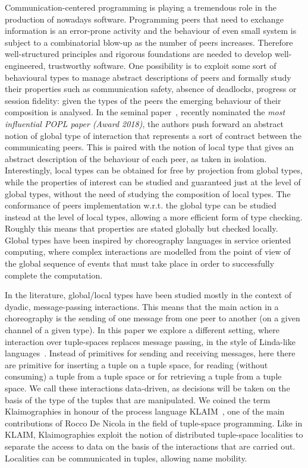 
Communication-centered programming is playing a tremendous role in the production of nowadays software. Programming peers that need to exchange information is an error-prone activity and the behaviour of even small system is subject to a combinatorial blow-up as the number of peers increases.
Therefore well-structured principles and rigorous foundations are needed to develop well-engineered, trustworthy software. 
One possibility is to exploit some sort of behavioural types to manage abstract descriptions of peers and formally study their properties such as communication safety, absence of deadlocks, progress or session fidelity: given the types of the peers the emerging behaviour of their composition is analysed.
In the seminal paper~\cite{DBLP:conf/popl/HondaYC08}, recently nominated the \emph{most influential POPL paper (Award 2018)}, the authors push forward an abstract notion of global type of interaction that represents a sort of contract between the communicating peers. This is paired with the notion of local type that gives an abstract description of the behaviour of each peer, as taken in isolation.
Interestingly, local types can be obtained for free by projection from global types, while the properties of interest can be studied and guaranteed just at the level of global types, without the need of studying the composition of local types. The conformance of peers implementation w.r.t. the global type can be studied instead at the level of local types, allowing a more efficient form of type checking. Roughly this means that properties are stated globally but checked locally. Global types have been inspired by choreography languages in service oriented computing, where complex interactions are modelled from the point of view of the global sequence of events that must take place in order to successfully complete the computation.

In the literature, global/local types have been studied mostly in the context of dyadic, message-passing interactions. This means that the main action in a choreography is the sending of one message from one peer to another (on a given channel of a given type). In this paper we explore a different setting, where interaction over tuple-spaces replaces message passing, in the style of Linda-like languages~\cite{}.
Instead of primitives for sending and receiving messages, here there are primitive for inserting a tuple on a tuple space, for reading (without consuming) a tuple from a tuple space or for retrieving a tuple from a tuple space. We call these interactions data-driven, as decisions will be taken on the basis of the type of the tuples that are manipulated. We coined the term Klaimographies in honour of the process language KLAIM~\cite{DBLP:journals/tse/NicolaFP98}, one of the main contributions of Rocco De Nicola in the field of tuple-space programming. Like in KLAIM, Klaimographies exploit the notion of distributed tuple-space localities to separate the access to data on the basis of the interactions that are carried out. Localities can be communicated in tuples, allowing name mobility.

